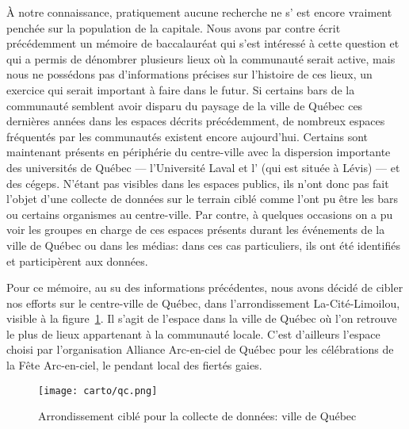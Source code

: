 À notre connaissance, pratiquement aucune recherche ne s’ est encore vraiment penchée sur la population \lgbt{} de la capitale.
Nous avons par contre écrit précédemment un mémoire de baccalauréat qui s'est intéressé à cette question et qui a permis de dénombrer plusieurs lieux où la communauté serait active, mais nous ne possédons pas d'informations précises sur l'histoire de ces lieux, un exercice qui serait important à faire dans le futur.
Si certains bars de la communauté semblent avoir disparu du paysage de la ville de Québec ces dernières années dans les espaces décrits précédemment, de nombreux espaces fréquentés par les communautés \lgbt{} existent encore aujourd'hui.
Certains sont maintenant présents en périphérie du centre-ville avec la dispersion importante des universités de Québec --- l'Université Laval et l'\uqar{} (qui est située à Lévis) --- et des cégeps.
N'étant pas visibles dans les espaces publics, ils n'ont donc pas fait l'objet d'une collecte de données sur le terrain ciblé comme l'ont pu être les bars ou certains organismes au centre-ville.
Par contre, à quelques occasions on a pu voir les groupes en charge de ces espaces présents durant les événements \lgbt{} de la ville de Québec ou dans les médias: dans ces cas particuliers, ils ont été identifiés et participèrent aux données.

Pour ce mémoire, au su des informations précédentes, nous avons décidé de cibler nos efforts sur le centre-ville de Québec, dans l'arrondissement La-Cité-Limoilou, visible à la figure~\ref{fig:espaces_quebec}.
Il s'agit de l'espace dans la ville de Québec où l'on retrouve le plus de lieux appartenant à la communauté \lgbt{} locale.
C'est d'ailleurs l'espace choisi par l'organisation Alliance Arc-en-ciel de Québec pour les célébrations de la Fête Arc-en-ciel, le pendant local des fiertés gaies.

\label{ssub:la_ville_de_quebec}
\begin{figure}[ht]
 \centering
 \texttt{[image: carto/qc.png]}
 \caption{Arrondissement ciblé pour la collecte de données: ville de Québec}\label{fig:espaces_quebec}
\end{figure}


